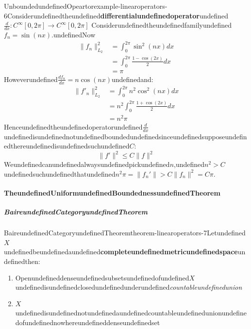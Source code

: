 \begin{mystthmexample}{UnboundedundefinedOpeartor}{example-linearoperators-6}Considerundefinedtheundefined\textbf{differentialundefinedoperator}undefined$\frac{d}{dx}: C^{\infty}[0,2\pi]\to C^{\infty}[0,2\pi]$
Considerundefinedtheundefinedfamilyundefined$f_n=\sin(nx)$.undefinedNow
\begin{equation}
\begin{aligned}
\|f_n\|^2_{L_2} &=\int_0^{2\pi}\sin^2(nx)dx \\
&=\int_0^{2\pi}\frac{1-\cos(2x)}{2}dx \\
&=\pi
\end{aligned}
\end{equation}
Howeverundefined$\frac{df_n}{dx}=n\cos(nx)$undefinedand:
\begin{equation}
\begin{aligned}
\|f'_n\|^2_{L_2}&= \int_0^{2\pi} n^2\cos^2(nx)dx \\
&=n^2\int_0^{2\pi}\frac{1+\cos(2x)}{2} dx \\
&= n^2\pi
\end{aligned}
\end{equation}
Henceundefinedtheundefinedoperatorundefined$\frac{d}{dx}$undefinedisundefinednotundefinedboundedundefinedsinceundefinedsupposeundefinedthereundefinedisundefinedsuchundefined$C$:
\begin{equation}
\|f'\|^2 \leq C\|f\|^2
\end{equation}
Weundefinedcanundefinedalwaysundefinedpickundefined$n$,undefined$n^2 >C$undefinedsuchundefinedthatundefined$n^2\pi =\|f_n'\|>C\|f_n\|^2=C\pi$.

\end{mystthmexample}
\paragraph{TheundefinedUniformundefinedBoundednessundefinedTheorem}

\subparagraph{BaireundefinedCategoryundefinedTheorem}

\begin{mystthmtheorem}{BaireundefinedCategoryundefinedTheorem}{theorem-linearoperators-7}Letundefined$X$undefinedbeundefinedaundefined\textbf{completeundefinedmetricundefinedspace}undefinedthen:

\begin{enumerate}
\item Openundefineddenseundefinedsubsetsundefinedofundefined$X$undefinedisundefinedclosedundefinedunderundefined\textit{countableundefinedunion}
\item $X$undefinedisundefinednotundefinedaundefinedcountableundefinedunionundefinedofundefinednowhereundefineddenseundefinedset
\end{enumerate}

\end{mystthmtheorem}